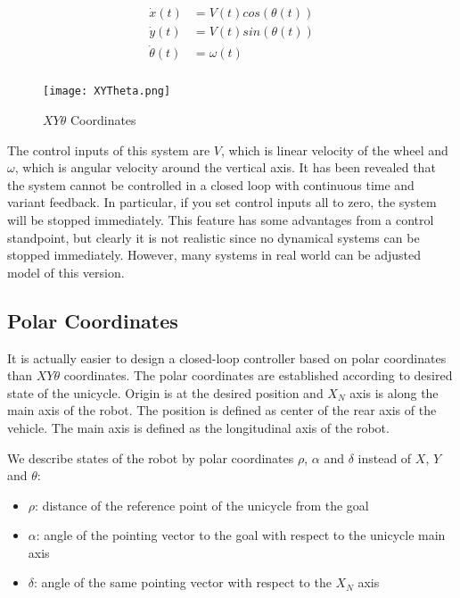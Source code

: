 \documentclass[twoside]{article}
\begin{document}
\begin{equation} \label{xytheta}
\begin{split}
\dot{x}(t) &= V(t) cos(\theta(t)) \\
\dot{y}(t) &= V(t) sin(\theta(t)) \\
\dot{\theta}(t) &= \omega(t)  \\
\end{split}
\end{equation}

\begin{figure}[h]
\centering
\texttt{[image: XYTheta.png]}
\caption{$XY\theta$ Coordinates}
\label{XYThetaFigure}
\end{figure}

The control inputs of this system are $V$, which is linear velocity of the wheel and $\omega$, which is angular velocity around the vertical axis. It has been revealed that the system cannot be controlled in a closed loop with continuous time and variant feedback. In particular, if you set control inputs all to zero, the system will be stopped immediately. This feature has some advantages from a control standpoint, but clearly it is not realistic since no dynamical systems can be stopped immediately. However, many systems in real world can be adjusted model of this version.

\subsection{Polar Coordinates}
It is actually easier to design a closed-loop controller based on polar coordinates than $XY\theta$ coordinates. The polar coordinates are established according to desired state of the unicycle. Origin is at the desired position and $X_N$ axis is along the main axis of the robot. The position is defined as center of the rear axis of the vehicle. The main axis is defined as the longitudinal axis of the robot.

We describe states of the robot by polar coordinates $\rho$, $\alpha$ and $\delta$ instead of $X$, $Y$ and $\theta$:
\begin{itemize}
  \item $\rho$: distance of the reference point of the unicycle from the goal
  \item $\alpha$: angle of the pointing vector to the goal with respect to the unicycle main axis
  \item $\delta$: angle of the same pointing vector with respect to the $X_N$ axis
\end{itemize}
\end{document}
